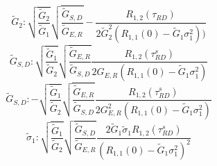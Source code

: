 \begin{equation}
\tilde{G}_2 :
\sqrt{\frac{\tilde{G}_2}{\tilde{G}_1}}
\sqrt{\frac{\tilde{G}_{S,D}}{\tilde{G}_{E,R}}}
-\frac{R_{1,2}(\tau_{RD})}
{2\tilde{G}_2^2(R_{1,1}(0) - \tilde{G}_1 \sigma_1^2) )} 
\end{equation}
\begin{equation}
\tilde{G}_{S,D}:
 \sqrt{\frac{\tilde{G}_1}{\tilde{G}_2}}
 \sqrt{\frac{\tilde{G}_{E,R}}{\tilde{G}_{S,D}}}  
\frac{R_{1,2}(\tau^s_{RD})}{2 G_{E,R} (R_{1,1}(0)-\tilde{G}_1 \sigma^2_1)} 
\end{equation}
\begin{equation}
\tilde{G}_{S,D}:
 -\sqrt{\frac{\tilde{G}_1}{\tilde{G}_2}}
 \sqrt{\frac{\tilde{G}_{E,R}}{\tilde{G}_{S,D}}}  
\frac{R_{1,2}(\tau^s_{RD})}{2 G_{E,R}^2 (R_{1,1}(0)-\tilde{G}_1 \sigma^2_1)} 
\end{equation}\begin{equation}
\tilde{\sigma}_1:
\sqrt{\frac{\tilde{G}_1}{\tilde{G}_2}} \sqrt{\frac{\tilde{G}_{S,D}}{\tilde{G}_{E,R}}}  
\frac{2 \tilde{G}_1 \tilde{\sigma}_1 R_{1,2}(\tau^s_{RD})}{(R_{1,1}(0)-\tilde{G}_1 \sigma^2_1)^2} 
\end{equation}